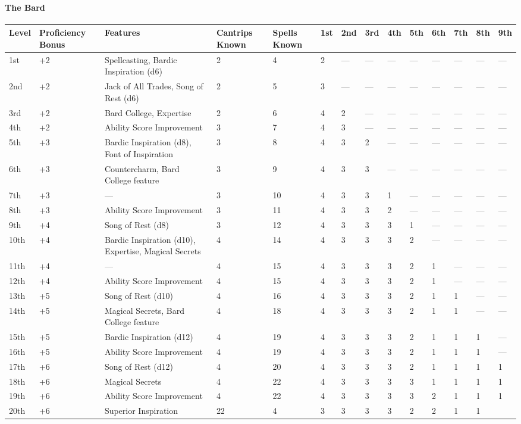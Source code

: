 \documentclass[
]{article}
\begin{document}
\hypertarget{the-bard}{%
\paragraph{The Bard}\label{the-bard}}

\begin{longtable}[]{@{}llllllllllllll@{}}
\toprule
Level & Proficiency Bonus & Features & Cantrips Known & Spells Known &
1st & 2nd & 3rd & 4th & 5th & 6th & 7th & 8th & 9th\tabularnewline
\midrule
\endhead
1st & +2 & Spellcasting, Bardic Inspiration (d6) & 2 & 4 & 2 & --- & ---
& --- & --- & --- & --- & --- & ---\tabularnewline
2nd & +2 & Jack of All Trades, Song of Rest (d6) & 2 & 5 & 3 & --- & ---
& --- & --- & --- & --- & --- & ---\tabularnewline
3rd & +2 & Bard College, Expertise & 2 & 6 & 4 & 2 & --- & --- & --- &
--- & --- & --- & ---\tabularnewline
4th & +2 & Ability Score Improvement & 3 & 7 & 4 & 3 & --- & --- & --- &
--- & --- & --- & ---\tabularnewline
5th & +3 & Bardic Inspiration (d8), Font of Inspiration & 3 & 8 & 4 & 3
& 2 & --- & --- & --- & --- & --- & ---\tabularnewline
6th & +3 & Countercharm, Bard College feature & 3 & 9 & 4 & 3 & 3 & ---
& --- & --- & --- & --- & ---\tabularnewline
7th & +3 & --- & 3 & 10 & 4 & 3 & 3 & 1 & --- & --- & --- & --- &
---\tabularnewline
8th & +3 & Ability Score Improvement & 3 & 11 & 4 & 3 & 3 & 2 & --- &
--- & --- & --- & ---\tabularnewline
9th & +4 & Song of Rest (d8) & 3 & 12 & 4 & 3 & 3 & 3 & 1 & --- & --- &
--- & ---\tabularnewline
10th & +4 & Bardic Inspiration (d10), Expertise, Magical Secrets & 4 &
14 & 4 & 3 & 3 & 3 & 2 & --- & --- & --- & ---\tabularnewline
11th & +4 & --- & 4 & 15 & 4 & 3 & 3 & 3 & 2 & 1 & --- & --- &
---\tabularnewline
12th & +4 & Ability Score Improvement & 4 & 15 & 4 & 3 & 3 & 3 & 2 & 1 &
--- & --- & ---\tabularnewline
13th & +5 & Song of Rest (d10) & 4 & 16 & 4 & 3 & 3 & 3 & 2 & 1 & 1 &
--- & ---\tabularnewline
14th & +5 & Magical Secrets, Bard College feature & 4 & 18 & 4 & 3 & 3 &
3 & 2 & 1 & 1 & --- & ---\tabularnewline
15th & +5 & Bardic Inspiration (d12) & 4 & 19 & 4 & 3 & 3 & 3 & 2 & 1 &
1 & 1 & ---\tabularnewline
16th & +5 & Ability Score Improvement & 4 & 19 & 4 & 3 & 3 & 3 & 2 & 1 &
1 & 1 & ---\tabularnewline
17th & +6 & Song of Rest (d12) & 4 & 20 & 4 & 3 & 3 & 3 & 2 & 1 & 1 & 1
& 1\tabularnewline
18th & +6 & Magical Secrets & 4 & 22 & 4 & 3 & 3 & 3 & 3 & 1 & 1 & 1 &
1\tabularnewline
19th & +6 & Ability Score Improvement & 4 & 22 & 4 & 3 & 3 & 3 & 3 & 2 &
1 & 1 & 1\tabularnewline
20th & +6 & Superior Inspiration & 22 & 4 & 3 & 3 & 3 & 3 & 2 & 2 & 1 &
1 &\tabularnewline
\bottomrule
\end{longtable}
\end{document}
